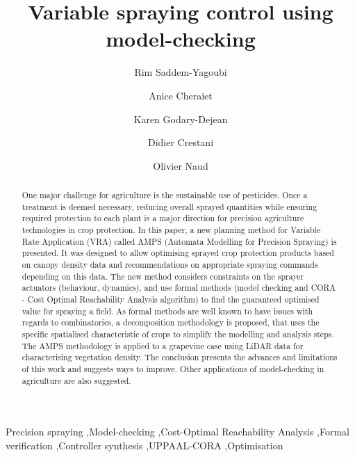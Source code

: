 \documentclass[preprint,3p,times,twocolumn]{elsarticle}
\begin{document}
\linenumbers
\begin{frontmatter}
\title{Variable spraying control using model-checking}


\author[inst1]{Rim Saddem-Yagoubi}
\author[inst3]{Anice Cheraiet}

\author[inst2]{Karen Godary-Dejean}
\author[inst2]{Didier Crestani}
\author[inst3]{Olivier Naud}


         
\begin{abstract}
	One major challenge for agriculture is the sustainable use of pesticides. Once a treatment is deemed necessary, reducing overall sprayed quantities while ensuring required protection to each plant is a major direction for precision agriculture technologies in crop protection. In this paper, a new planning method for Variable Rate Application (VRA) called AMPS (Automata Modelling for Precision Spraying) is presented. It was designed to allow optimising sprayed crop protection products based on canopy density data and recommendations on appropriate spraying commands depending on this data. The new method considers constraints on the sprayer actuators (behaviour, dynamics), and use formal methods (model checking and CORA - Cost Optimal Reachability Analysis algorithm) to find the guaranteed optimised value for spraying a field. As formal methods are well known to have issues with regards to combinatorics, a decomposition methodology is proposed, that uses the specific spatialised characteristic of crops to simplify the modelling and analysis steps. The AMPS methodology is applied to a grapevine case using LiDAR data for characterising vegetation density.  The conclusion presents the advances and limitations of this work and suggests ways to improve. Other applications of model-checking in agriculture are also suggested.
\end{abstract}

\begin{keyword}
	
	Precision spraying \sep Model-checking \sep Cost-Optimal Reachability Analysis   \sep Formal verification \sep Controller
	synthesis  \sep   UPPAAL-CORA  \sep  Optimisation 
\end{keyword}

\end{frontmatter}
\end{document}
